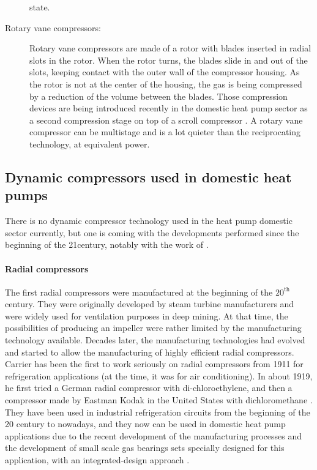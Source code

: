 \begin{description}
  state.
\item[Rotary vane compressors:]Rotary vane compressors are made of a
  rotor with blades inserted in radial slots in the rotor. When the
  rotor turns, the blades slide in and out of the slots, keeping
  contact with the outer wall of the compressor housing. As the rotor
  is not at the center of the housing, the gas is being compressed by
  a reduction of the volume between the blades. Those compression
  devices are being introduced recently in the domestic heat pump
  sector as a second compression stage on top of a scroll compressor
  \citep{Kondo-Kimata-2010a,Mitsubishi-2011a,Sato-Kobayashi-2012a}. A
  rotary vane compressor can be multistage and is a lot quieter than
  the reciprocating technology, at equivalent power.
\end{description}

\subsection{Dynamic compressors used in domestic
  heat pumps}
\label{sec:sota-dyn-cp}

There is no dynamic compressor technology used in the heat pump
domestic sector currently, but one is coming with the developments
performed since the beginning of the 21\th century, notably with the
work of \citet{schiffmann-2008a}.

\paragraph{Radial compressors}

The first radial compressors were manufactured at the beginning of the
$20^{\text{th}}$ century. They were originally developed by steam
turbine manufacturers and were widely used for ventilation purposes in
deep mining. At that time, the possibilities of producing an impeller
were rather limited by the manufacturing technology available. Decades
later, the manufacturing technologies had evolved and started to allow
the manufacturing of highly efficient radial compressors. Carrier has
been the first to work seriously on radial compressors from 1911 for
refrigeration applications (at the time, it was for air
conditioning). In about 1919, he first tried a German radial
compressor with di-chloroethylene, and then a compressor made by
Eastman Kodak in the United States with dichloromethane
\citep[p.\,16]{zogg-2008a}. They have been used in industrial
refrigeration circuits from the beginning of the 20\th{} century to
nowadays, and they now can be used in domestic heat pump applications
due to the recent development of the manufacturing processes and the
development of small scale gas bearings sets specially designed for
this application, with an integrated-design approach
\citep{schiffmann-2008a}.


